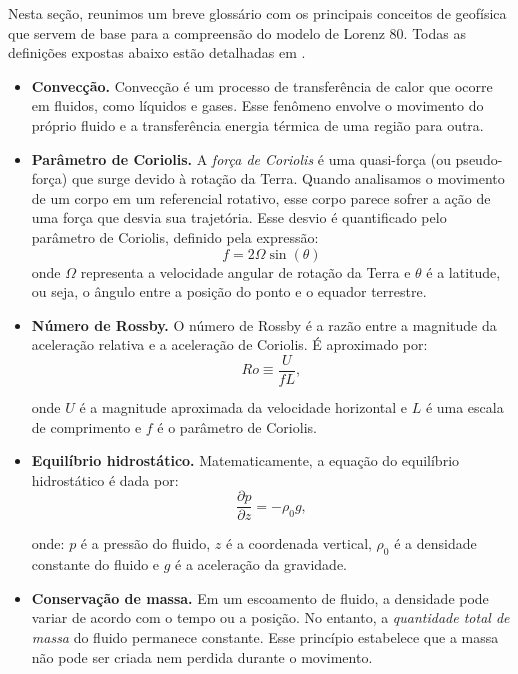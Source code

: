 Nesta seção, reunimos um breve glossário com os principais conceitos de geofísica que servem de base para a compreensão do modelo de Lorenz 80. Todas as definições expostas abaixo estão detalhadas em \citet{Vallis2017}.
\begin{itemize}
    \item \textbf{Convecção.} Convecção é um processo de transferência de calor que ocorre em
    fluidos, como líquidos e gases. Esse fenômeno envolve o movimento do próprio
    fluido e a transferência energia térmica de uma região para outra.
	\item \textbf{Parâmetro de Coriolis.} A \textit{força de Coriolis} é uma quasi-força (ou pseudo-força) que surge devido à rotação da Terra. Quando analisamos o movimento de um corpo em um referencial rotativo, esse corpo parece sofrer a ação de uma força que desvia sua trajetória. Esse desvio é quantificado pelo parâmetro de Coriolis, definido pela expressão:
	      \begin{equation*}
	      	f = 2 \Omega \sin(\theta)
	      \end{equation*}
	      onde $\Omega$ representa a velocidade angular de rotação da Terra e $\theta$ é a latitude, ou seja, o ângulo entre a posição do ponto e o equador terrestre.
	      
	\item \textbf{Número de Rossby.} O número de Rossby é a razão entre a magnitude da aceleração relativa e a aceleração de Coriolis. É aproximado por:
	      \begin{equation*}
	      	Ro \equiv \frac{U}{fL},
	      \end{equation*}
	      
	      onde $U$ é a magnitude aproximada da velocidade horizontal e $L$ é uma escala de comprimento e $f$ é o parâmetro de Coriolis.
	      
	\item \textbf{Equilíbrio hidrostático.} Matematicamente, a equação do equilíbrio hidrostático é dada por:
	      \begin{equation}
	      	\frac{\partial p}{\partial z} = - \rho_0g, \label{eq:equilibrio_hidrostatico}
	      \end{equation}
	          
	      onde: $p$ é a pressão do fluido, $z$ é a coordenada vertical, $\rho_0$ é a densidade constante do fluido e $g$ é a aceleração da gravidade.
	\item \textbf{Conservação de massa.} Em um escoamento de fluido, a densidade pode variar de acordo com o tempo ou a posição. No entanto, a \textit{quantidade total de massa} do fluido permanece constante. Esse princípio estabelece que a massa não pode ser criada nem perdida durante o movimento.
	      

\end{itemize}
